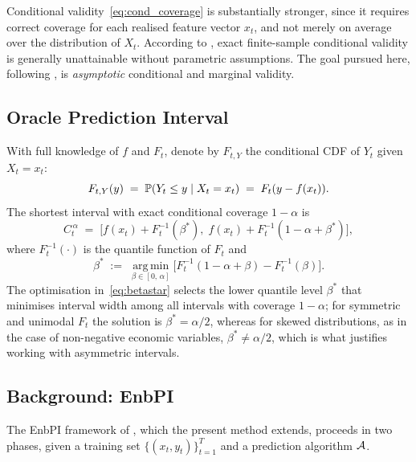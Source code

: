 Conditional validity~\eqref{eq:cond_coverage} is substantially
stronger, since it requires correct coverage for each realised
feature vector $x_t$, and not merely on average over the distribution
of $X_t$.  According to \citet{barber2023conformal}, exact
finite-sample conditional validity is generally unattainable without
parametric assumptions.  The goal pursued here, following
\citet{xu2023conformal}, is \emph{asymptotic} conditional and
marginal validity.

\subsection{Oracle Prediction Interval}
\label{sec:model:oracle}

With full knowledge of $f$ and $F_t$, denote by $F_{t,Y}$ the
conditional CDF of $Y_t$ given $X_t = x_t$:
%
\[
  F_{t,Y}(y) \;=\; \mathbb{P}(Y_t \leq y \mid X_t = x_t)
             \;=\; F_t(y - f(x_t)).
\]
%
The shortest interval with exact conditional coverage $1-\alpha$ is
%
\begin{equation}
  \label{eq:oracle}
  C_t^{\,\alpha}
  \;=\;
  \bigl[f(x_t) + F_t^{-1}(\beta^*),\;
        f(x_t) + F_t^{-1}(1-\alpha+\beta^*)\bigr],
\end{equation}
%
where $F_t^{-1}(\cdot)$ is the quantile function of $F_t$ and
%
\begin{equation}
  \label{eq:betastar}
  \beta^* \;:=\;
  \operatorname*{arg\,min}_{\beta\in[0,\,\alpha]}
  \bigl[F_t^{-1}(1-\alpha+\beta) - F_t^{-1}(\beta)\bigr].
\end{equation}
%
The optimisation in~\eqref{eq:betastar} selects the lower quantile
level $\beta^*$ that minimises interval width among all intervals
with coverage $1-\alpha$; for symmetric and unimodal $F_t$ the
solution is $\beta^* = \alpha/2$, whereas for skewed distributions,
as in the case of non-negative economic variables,
$\beta^* \neq \alpha/2$, which is what justifies working with
asymmetric intervals.

\subsection{Background: EnbPI}
\label{sec:model:enbpi}

The EnbPI framework of \citet{xu2023conformal}, which the present
method extends, proceeds in two phases, given a training set
$\{(x_t,y_t)\}_{t=1}^T$ and a prediction algorithm $\mathcal{A}$.

